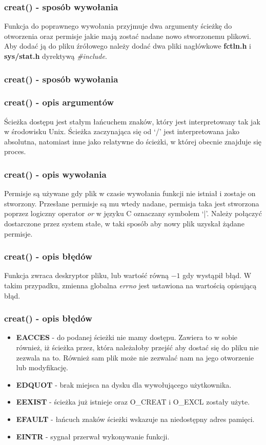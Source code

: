 \documentclass{beamer}
\begin{document}
\begin{frame}
	\frametitle{creat() - sposób wywołania}
Funkcja do poprawnego wywołania przyjmuje dwa argumenty ścieżkę do otworzenia oraz permisje jakie mają zostać nadane nowo stworzonemu plikowi.
Aby dodać ją do pliku źrółowego należy dodać dwa pliki nagłówkowe \textbf{fctln.h} i \textbf{sys/stat.h} dyrektywą \textit{\#include}.
\end{frame}

\begin{frame}
	\frametitle{creat() - sposób wywołania}
	\lstcreat
\end{frame}

\begin{frame}
	\frametitle{creat() - opis argumentów}
Ścieżka dostępu jest stałym łańcuchem znaków, który jest interpretowany tak jak w środowisku Unix.
Ścieżka zaczynająca się od `/' jest interpretowana jako absolutna, natomiast inne jako relatywne do
ścieżki, w której obecnie znajduje się proces.
\end{frame}

\begin{frame}
	\frametitle{creat() - opis wywołania}
Permisje są używane gdy plik w czasie wywołania funkcji nie istniał i zostaje on stworzony.
Przesłane permisje są mu wtedy nadane, permisja taka jest stworzona poprzez logiczny operator
\textit{or} w języku C oznaczany symbolem `|'. Należy połączyć dostarczone przez system stałe,
w taki sposób aby nowy plik uzyskał żądane permisje.
\end{frame}

\begin{frame}
	\frametitle{creat() - opis błędów}
Funkcja zwraca deskryptor pliku, lub wartość równą $-1$ gdy wystąpił błąd.
W takim przypadku, zmienna globalna \textit{errno} jest ustawiona na wartością opisującą błąd.
\end{frame}

\begin{frame}
	\frametitle{creat() - opis błędów}
\begin{itemize}
\item \textbf{EACCES} - do podanej ścieżki nie mamy dostępu. Zawiera to w sobie również,
iż ścieżka przez, która należałoby przejść aby dostać się do pliku nie zezwala na to.
Również sam plik może nie zezwalać nam na jego otworzenie lub modyfikację.
\item \textbf{EDQUOT} - brak miejsca na dysku dla wywołującego użytkownika.
\item \textbf{EEXIST} - ścieżka już istnieje oraz O\_CREAT i O\_EXCL zostały użyte.
\item \textbf{EFAULT} - łańcuch znaków ścieżki wskazuje na niedostępny adres pamięci.
\item \textbf{EINTR} - sygnał przerwał wykonywanie funkcji.
\end{itemize}
\end{frame}
\end{document}
